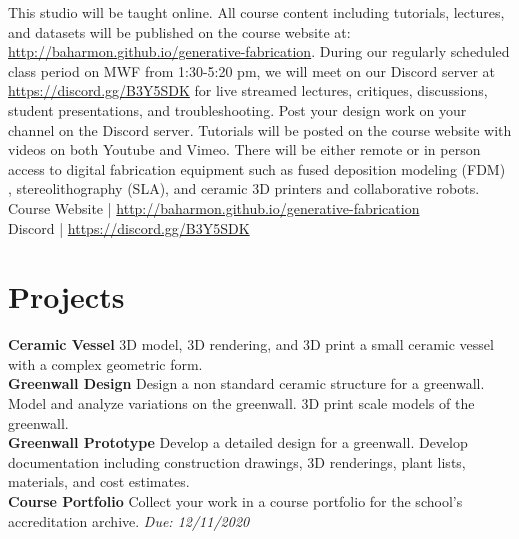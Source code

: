 \documentclass[11pt,article,oneside]{memoir}
\begin{document}
This studio will be taught online.
All course content including tutorials, lectures, and datasets
will be published on the course website at:
\url{http://baharmon.github.io/generative-fabrication}.
During our regularly scheduled class period on MWF from 1:30-5:20 pm,
we will meet on our Discord server at \url{https://discord.gg/B3Y5SDK}
for live streamed lectures, critiques, discussions, 
student presentations, and troubleshooting. 
Post your design work on your channel on the Discord server.
Tutorials will be posted on the course website
with videos on both Youtube and Vimeo. 
There will be either remote or in person access 
to digital fabrication equipment 
such as fused deposition modeling (FDM) ,
stereolithography (SLA), and ceramic 3D printers
and collaborative robots.\\

\noindent
Course Website | \url{http://baharmon.github.io/generative-fabrication}\\
Discord | \url{https://discord.gg/B3Y5SDK}\\


\section{Projects}

\noindent \textbf{Ceramic Vessel}
3D model, 3D rendering, and 3D print 
a small ceramic vessel 
with a complex geometric form.\\

\noindent \textbf{Greenwall Design}
Design a non standard ceramic structure for a greenwall.
Model and analyze variations on the greenwall. 
3D print scale models of the greenwall.\\

\noindent \textbf{Greenwall Prototype}
Develop a detailed design for a greenwall.
Develop documentation including 
construction drawings, 3D renderings,
plant lists, materials, and cost estimates.\\

\noindent \textbf{Course Portfolio}
Collect your work in a course portfolio 
for the school's accreditation archive.
\emph{Due: 12/11/2020}\\
\end{document}
